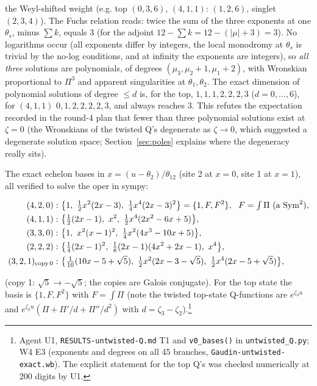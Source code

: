 \documentclass[11pt]{article}
\begin{document}
the Weyl-shifted weight (e.g. top $(0,3,6)$, $(4,1,1)$: $(1,2,6)$, singlet $(2,3,4)$).
The Fuchs relation reads: twice the sum of the three exponents at one $\theta_s$, minus $\sum k$, equals $3$ (for the adjoint $12-\sum k=12-(|\mu|+3)=3$).
No logarithms occur (all exponents differ by integers, the local monodromy at $\theta_s$ is trivial by the no-log conditions, and at infinity the exponents are integers), so \emph{all three} solutions are polynomials, of degrees $(\mu_3,\mu_2+1,\mu_1+2)$, with Wronskian proportional to $\Pi^3$ and apparent singularities at $\theta_1,\theta_2$. The exact dimension of polynomial solutions of degree $\le d$ is, for the top, $1,1,1,2,2,2,3$ ($d=0,\dots,6$), for $(4,1,1)$ $0,1,2,2,2,2,3$, and always reaches $3$. This refutes the expectation recorded in the round-4 plan that fewer than three polynomial solutions exist at $\zeta=0$ (the Wronskians of the twisted Q's degenerate as $\zeta\to0$, which suggested a degenerate solution space; Section~\ref{sec:poles} explains where the degeneracy really sits).

The exact echelon bases in $x=(u-\theta_2)/\theta_{12}$ (site 2 at $x=0$, site 1 at $x=1$), all verified to solve the oper in sympy:

\begin{equation}
\begin{aligned}
(4,2,0):&\ \bigl\{1,\ \tfrac12x^2(2x-3),\ \tfrac14x^4(2x-3)^2\bigr\}=\{1,F,F^2\},\ \ F=\textstyle\int\Pi\ (\text{a }\mathrm{Sym}^2),\\
(4,1,1):&\ \bigl\{\tfrac12(2x-1),\ x^2,\ \tfrac12x^4(2x^2-6x+5)\bigr\},\\
(3,3,0):&\ \bigl\{1,\ x^2(x-1)^2,\ \tfrac14x^2(4x^3-10x+5)\bigr\},\\
(2,2,2):&\ \bigl\{\tfrac14(2x-1)^2,\ \tfrac18(2x-1)(4x^2+2x-1),\ x^4\bigr\},\\
(3,2,1)_{\rm copy\,0}:&\ \bigl\{\tfrac1{10}(10x-5+\sqrt5),\ \tfrac12x^2(2x-3-\sqrt5),\ \tfrac12x^4(2x-5+\sqrt5)\bigr\},
\end{aligned}\label{eq:v0bases}
\end{equation}

(copy 1: $\sqrt5\to-\sqrt5$; the copies are Galois conjugate).
For the top state the basis is $\{1,F,F^2\}$ with $F=\int\Pi$ (note the twisted top-state Q-functions are $e^{\zeta_3u}$ and $e^{\zeta_2u}(\Pi+\Pi'/d+\Pi''/d^2)$ with $d=\zeta_3-\zeta_2$).\footnote{Agent U1, \texttt{RESULTS-\allowbreak{}untwisted-\allowbreak{}Q.\allowbreak{}md} T1 and \texttt{v0\_\allowbreak{}bases()} in \texttt{untwisted\_\allowbreak{}Q.\allowbreak{}py}; W4 E3 (exponents and degrees on all 45 branches, \texttt{Gaudin-\allowbreak{}untwisted-\allowbreak{}exact.\allowbreak{}wb}).
The explicit statement for the top Q's was checked numerically at 200 digits by U1.}
\end{document}
